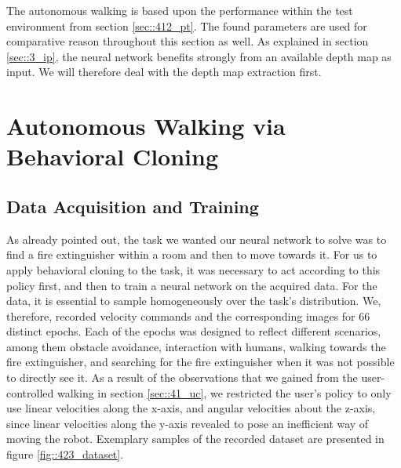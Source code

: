 \FloatBarrier
\label{sec::42_ab}
The autonomous walking is based upon the performance within the test environment from section \ref{sec::412_pt}. The found parameters are used for comparative reason throughout this section as well. As explained in section \ref{sec::3_ip}, the neural network benefits strongly from an available depth map as input. We will therefore deal with the depth map extraction first.
\FloatBarrier
\section{Autonomous Walking via Behavioral Cloning}
\FloatBarrier
\subsection{Data Acquisition and Training}
\label{sec::423_da}
As already pointed out, the task we wanted our neural network to solve was to find a fire extinguisher within a room and then to move towards it. For us to apply behavioral cloning to the task, it was necessary to act according to this policy first, and then to train a neural network on the acquired data. For the data, it is essential to sample homogeneously over the task's distribution. We, therefore, recorded velocity commands and the corresponding images for 66 distinct epochs. Each of the epochs was designed to reflect different scenarios, among them obstacle avoidance, interaction with humans, walking towards the fire extinguisher, and searching for the fire extinguisher when it was not possible to directly see it. As a result of the observations that we gained from the user-controlled walking in section \ref{sec::41_uc}, we restricted the user's policy to only use linear velocities along the x-axis, and angular velocities about the z-axis, since linear velocities along the y-axis revealed to pose an inefficient way of moving the robot. Exemplary samples of the recorded dataset are presented in figure \ref{fig::423_dataset}.
